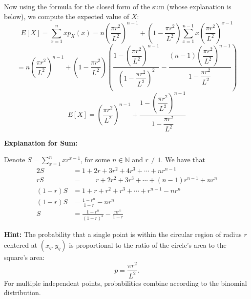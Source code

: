 \documentclass{assignment-263}
\begin{document}
\begin{enumerate}
\begin{enumerate}
    Now using the formula for the closed form of the sum (whose explanation is below), we compute the expected value of \(X\):
    \[
      E[X] = \sum_{x=1}^{n} x p_X(x) = n\left( \dfrac{\pi r^2}{L^2} \right)^{n-1} + \left( 1 - \dfrac{\pi r^2}{L^2} \right)\sum_{x=1}^{n-1} x\left( \dfrac{\pi r^2}{L^2} \right)^{x - 1}
    \]
    \[
      = n\left( \dfrac{\pi r^2}{L^2} \right)^{n-1} + \left( 1 - \dfrac{\pi r^2}{L^2} \right) \left( \frac{ 1 - \left( \dfrac{\pi r^2}{L^2} \right)^{n-1}}{\left( 1 - \dfrac{\pi r^2}{L^2} \right)^2} - \frac{(n-1)\left( \dfrac{\pi r^2}{L^2} \right)^{n-1}}{1 - \dfrac{\pi r^2}{L^2}} \right) 
    \]
    \[
      E[X] = \left( \dfrac{\pi r^2}{L^2} \right)^{n-1} + \frac{ 1 - \left( \dfrac{\pi r^2}{L^2} \right)^{n-1}}{1 - \dfrac{\pi r^2}{L^2}}
    \]
    \bigskip

    \textbf{Explanation for Sum:}

    Denote \(S = \sum_{x=1}^{n} xr^{x - 1}\), for some \(n \in \mathbb{N}\) and \(r \neq 1\). We have that
    \begin{alignat*}{2}
      S &= 1 + 2r + 3r^2 + 4r^3 + \cdots + nr^{n-1} \\
      rS &= \qquad r + 2r^2 + 3r^3 + \cdots + {(n-1)r^{n-1}} + nr^n \\
      (1 - r)S &= 1 + r + r^2 + r^3 + \cdots + r^{n-1} - nr^n \\
      (1 - r)S &= \frac{1 - r^n}{1 - r} - nr^n \\
      S &= \frac{1 - r^n}{(1-r)^2} - \frac{nr^n}{1-r}
    \end{alignat*}
\end{enumerate}

\end{enumerate}

\bigskip

\noindent \textbf{Hint:} The probability that a single point is within the circular region of radius $r$ centered at $(x_q, y_q)$ is proportional to the ratio of the circle's area to the square's area:
\[
p = \frac{\pi r^2}{L^2}.
\]
For multiple independent points, probabilities combine according to the binomial distribution.

\program
\end{document}
